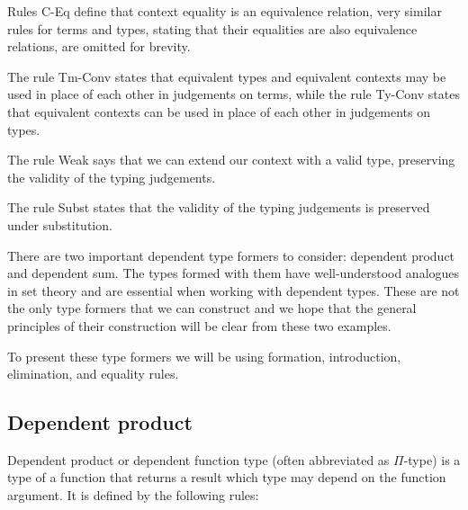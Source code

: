 Rules C-Eq define that context equality is an equivalence relation, very
similar rules for terms and types, stating that their equalities are also
equivalence relations, are omitted for brevity.

The rule Tm-Conv states that equivalent types and equivalent contexts may be
used in place of each other in judgements on terms, while the rule Ty-Conv
states that equivalent contexts can be used in place of each other in
judgements on types.

The rule Weak says that we can extend our context with a valid type, preserving
the validity of the typing judgements.

The rule Subst states that the validity of the typing judgements is preserved
under substitution.

There are two important dependent type formers to consider: dependent product
and dependent sum. The types formed with them have well-understood analogues in
set theory and are essential when working with dependent types. These are not
the only type formers that we can construct and we hope that the general
principles of their construction will be clear from these two examples.

To present these type formers we will be using formation, introduction,
elimination, and equality rules.

\subsection*{Dependent product}

Dependent product or dependent function type (often abbreviated as $\Pi$-type)
is a type of a function that returns a result which type may depend on the
function argument. It is defined by the following rules:

\begin{definition}
\end{definition}

